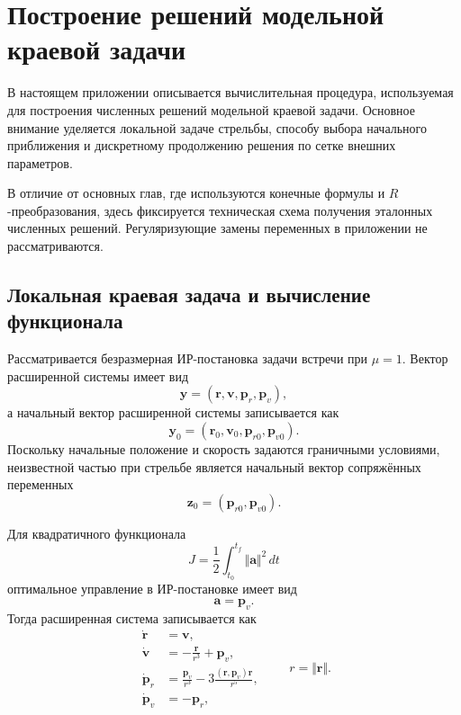 \chapter{Построение решений модельной краевой задачи}
\label{app:technical_bvp_procedure}

В настоящем приложении описывается вычислительная процедура, используемая для построения численных решений модельной краевой задачи. Основное внимание уделяется локальной задаче стрельбы, способу выбора начального приближения и дискретному продолжению решения по сетке внешних параметров.

В отличие от основных глав, где используются конечные формулы и \(R\)-преобразования, здесь фиксируется техническая схема получения эталонных численных решений. Регуляризующие замены переменных в приложении не рассматриваются.

\section*{Локальная краевая задача и вычисление функционала}

Рассматривается безразмерная ИР-постановка задачи встречи при \(\mu=1\). Вектор расширенной системы имеет вид
\begin{equation}
	\mathbf y=(\mathbf r,\mathbf v,\mathbf p_r,\mathbf p_v),
\end{equation}
а начальный вектор расширенной системы записывается как
\begin{equation}
	\mathbf y_0=(\mathbf r_0,\mathbf v_0,\mathbf p_{r0},\mathbf p_{v0}).
\end{equation}
Поскольку начальные положение и скорость задаются граничными условиями, неизвестной частью при стрельбе является начальный вектор сопряжённых переменных
\begin{equation}
	\mathbf z_0=(\mathbf p_{r0},\mathbf p_{v0}).
\end{equation}

Для квадратичного функционала
\begin{equation}
	J=\frac12\int_{t_0}^{t_f}\Vert\mathbf a\Vert^2\,dt
\end{equation}
оптимальное управление в ИР-постановке имеет вид
\begin{equation}
	\mathbf a=\mathbf p_v.
\end{equation}
Тогда расширенная система записывается как
\begin{equation}
	\begin{aligned}
		\dot{\mathbf r}&=\mathbf v,\\
		\dot{\mathbf v}&=-\frac{\mathbf r}{r^3}+\mathbf p_v,\\
		\dot{\mathbf p}_r&=
		\frac{\mathbf p_v}{r^3}
		-
		3\frac{(\mathbf r,\mathbf p_v)\mathbf r}{r^5},\\
		\dot{\mathbf p}_v&=-\mathbf p_r,
	\end{aligned}
	\qquad
	r=\Vert\mathbf r\Vert .
\end{equation}

